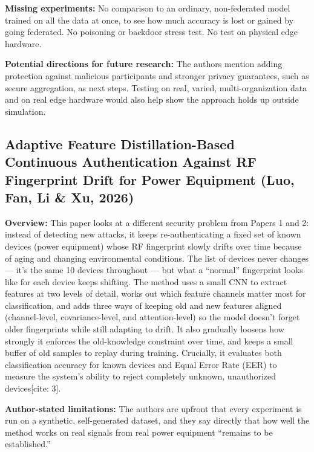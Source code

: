 \documentclass[10pt]{article}
\newcommand{\sumitem}[2]{\noindent\textbf{#1:} #2\par}
\begin{document}
\sumitem{Missing experiments}{No comparison to an ordinary, non-federated model trained on all the data at once, to see how much accuracy is lost or gained by going federated. No poisoning or backdoor stress test. No test on physical edge hardware.}

\sumitem{Potential directions for future research}{The authors mention adding protection against malicious participants and stronger privacy guarantees, such as secure aggregation, as next steps. Testing on real, varied, multi-organization data and on real edge hardware would also help show the approach holds up outside simulation.}

\clearpage
\subsection{Adaptive Feature Distillation-Based Continuous Authentication Against RF Fingerprint Drift for Power Equipment (Luo, Fan, Li \& Xu, 2026)}

\sumitem{Overview}{This paper looks at a different security problem from Papers 1 and 2: instead of detecting new attacks, it keeps re-authenticating a fixed set of known devices (power equipment) whose RF fingerprint slowly drifts over time because of aging and changing environmental conditions. The list of devices never changes --- it's the same 10 devices throughout --- but what a \enquote{normal} fingerprint looks like for each device keeps shifting. The method uses a small CNN to extract features at two levels of detail, works out which feature channels matter most for classification, and adds three ways of keeping old and new features aligned (channel-level, covariance-level, and attention-level) so the model doesn't forget older fingerprints while still adapting to drift. It also gradually loosens how strongly it enforces the old-knowledge constraint over time, and keeps a small buffer of old samples to replay during training. Crucially, it evaluates both classification accuracy for known devices and Equal Error Rate (EER) to measure the system's ability to reject completely unknown, unauthorized devices[cite: 3].}

\sumitem{Author-stated limitations}{The authors are upfront that every experiment is run on a synthetic, self-generated dataset, and they say directly that how well the method works on real signals from real power equipment \enquote{remains to be established.}}
\end{document}
